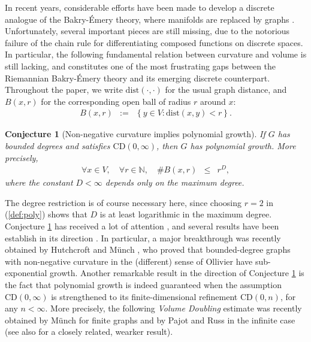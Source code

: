 \documentclass[12pt,final]{article}
\newtheorem{conjecture}{Conjecture}
\newcommand{\dN}{\mathbb {N}}
\newcommand{\CD}{\mathrm{CD}}
\newcommand{\dist}{{\mathrm{dist}}}
\begin{document}
In recent years, considerable efforts have been made to develop a discrete analogue of the Bakry-\'Emery theory, where manifolds are replaced by graphs  \cite{MR1665591,MR2644381,MR3173151,MR3492631, MR3592766,MR3776357,MR3906157,MR4045968,MR4946365,MR4545901,MR4828188,salez2025intrinsicregularitydiscretelogsobolev}. Unfortunately, several important pieces   are still missing, due to the notorious failure of the chain rule for differentiating composed functions on discrete spaces. In particular, the following fundamental relation between curvature and volume is still lacking, and constitutes one of the most frustrating gaps between the Riemannian Bakry-\'Emery theory and its emerging discrete  counterpart. Throughout the paper, we write $\dist(\cdot,\cdot)$ for the usual graph distance, and  $B(x,r)$ for the corresponding open ball of radius $r$ around $x$: 
\begin{eqnarray}
B(x,r) & := & \left\{y\in V\colon \dist(x,y)<r\right\}. 
\end{eqnarray}
\begin{conjecture}[Non-negative curvature implies polynomial growth]\label{conj:main} If $G$ has bounded degrees and satisfies $\CD(0,\infty)$, then $G$ has polynomial growth. More precisely,
\begin{eqnarray}
\label{def:poly}
\forall x\in V,\quad \forall r\in \dN,\quad \# B(x,r) & \le & r^D,
\end{eqnarray}
where the constant $D<\infty$  depends only on the maximum degree. 
\end{conjecture}
The degree restriction is of course necessary here, since choosing $r=2$ in (\ref{def:poly}) shows that $D$ is at least logarithmic in the maximum degree. 
Conjecture \ref{conj:main} has received a lot of attention \cite{hua2017ricci,münch2019,russ2025}, and several results have been establish in its direction \cite{MR3316971,MR4536468,MR4567745,hutchcroft2025}. In particular, a major breakthrough was recently obtained by Hutchcroft  and M\"unch \cite{hutchcroft2025}, who proved that bounded-degree graphs with non-negative  curvature in the (different) sense of Ollivier \cite{MR2484937} have sub-exponential growth. Another remarkable result in the direction of Conjecture \ref{conj:main} is the fact that polynomial growth is indeed guaranteed when the assumption  $\CD(0,\infty)$ is strengthened to its finite-dimensional refinement $\CD(0,n)$, for any  $n<\infty$.  More precisely, the following \emph{Volume Doubling} estimate was recently obtained by Münch \cite{münch2019} for finite graphs and by Pajot and Russ \cite{russ2025} in the infinite case (see also \cite{MR3316971} for a closely related,  wearker result).
\end{document}
